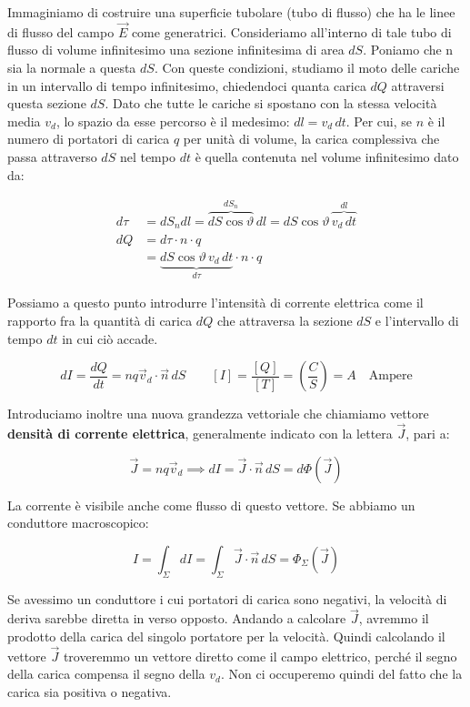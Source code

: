 Immaginiamo di costruire una superficie tubolare (tubo di flusso) che ha le linee di flusso del campo $\vec{E}$ come generatrici. Consideriamo all'interno di tale tubo di flusso di volume infinitesimo una sezione infinitesima di area $dS$. Poniamo che n sia la normale a questa $dS$. Con queste condizioni, studiamo il moto delle cariche in un intervallo di tempo infinitesimo, chiedendoci quanta carica $dQ$ attraversi questa sezione $dS$.
Dato che tutte le cariche si spostano con la stessa velocità media $ v_d  $, lo spazio da esse percorso è il medesimo: $dl =v_d\,dt$. Per cui, se $n$ è il numero di portatori di carica $q$ per unità di volume, la carica complessiva che passa attraverso $dS$ nel tempo $dt$ è quella contenuta nel volume infinitesimo dato da:

\begin{align*}
	d\tau &= dS_ndl = \overbrace{dS\cos \vartheta}^{dS_n}\,dl = dS\cos \vartheta \,\overbrace{v_d\,dt}^{dl} \\
	dQ &= d\tau \cdot n \cdot q \\
	&= \underbrace{dS\cos \vartheta \,v_d\,dt}_{d\tau}\cdot n\cdot q
\end{align*}

Possiamo a questo punto introdurre l'intensità di corrente elettrica come il rapporto fra la quantità di carica $dQ$ che attraversa la sezione $dS$ e l'intervallo di tempo $dt$ in cui ciò accade.

\[
	\boxed{dI=\frac{dQ}{dt}=nq\vec{v}_d\cdot \vec{n} \,dS} \qquad [I]=\frac{[Q]}{[T]} = \left( \frac{C}{S} \right) = A \quad \text{Ampere}
\]

Introduciamo inoltre una nuova grandezza vettoriale che chiamiamo vettore \textbf{densità di corrente elettrica}, generalmente indicato con la lettera $\vec{J}$, pari a:

\[
	\vec{J} =nq\vec{v}_d \implies dI=\vec{J} \cdot \vec{n} \,dS = d\Phi (\vec{J})
\]

La corrente è visibile anche come flusso di questo vettore. Se abbiamo un conduttore macroscopico:

\[
	I=\int_{\Sigma}dI = \int_{\Sigma}\vec{J} \cdot \vec{n} \,dS = \Phi_{\Sigma} (\vec{J})
\]

Se avessimo un conduttore i cui portatori di carica sono negativi, la velocità di deriva sarebbe diretta in verso opposto. Andando a calcolare $\vec{J}$, avremmo il prodotto della carica del singolo portatore per la velocità. Quindi calcolando il vettore $\vec{J}$ troveremmo un vettore diretto come il campo elettrico, perché il segno della carica compensa il segno della $ v_d  $. Non ci occuperemo quindi del fatto che la carica sia positiva o negativa.

